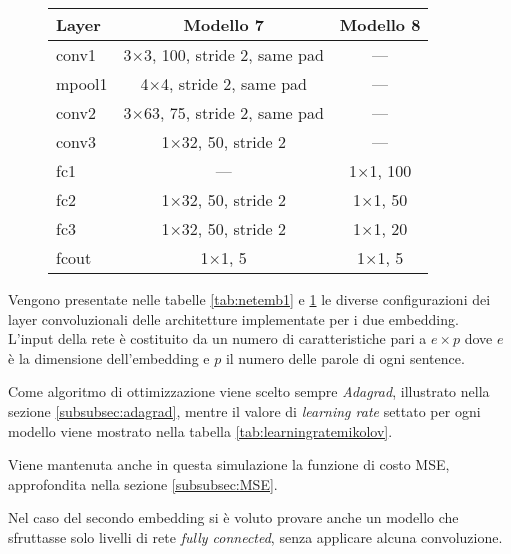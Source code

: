 \begin{figure}[H]
	\centering
	\begin{tabular}{lcc}
		\toprule
		\textbf{Layer}& \textbf{Modello 7} 								  & \textbf{Modello 8} 			   \\ 
		\midrule
		conv1 	& \num{3}$\times$\num{3}, 100, stride 2, same pad     & ---	   \\
		mpool1 	& \num{4}$\times$\num{4}, stride 2, same pad		  & ---	   \\
		conv2  	& \num{3}$\times$\num{63}, 75, stride 2, same pad	  & ---    \\
		conv3  	& \num{1}$\times$\num{32}, 50, stride 2	  				  & ---	   \\
		fc1  	& ---													  & \num{1}$\times$\num{1}, 100	   \\
		fc2  	& \num{1}$\times$\num{32}, 50, stride 2	  				  & \num{1}$\times$\num{1},  50    \\
		fc3  	& \num{1}$\times$\num{32}, 50, stride 2	  				  & \num{1}$\times$\num{1},  20	   \\
		fcout	& \num{1}$\times$\num{1}, 5   			  				  & \num{1}$\times$\num{1},   5	   \\
		\bottomrule	
	\end{tabular}
	\label{tab:netemb2}
\end{figure}

Vengono presentate nelle tabelle \ref{tab:netemb1} e \ref{tab:netemb2} le diverse configurazioni dei layer convoluzionali delle architetture implementate per i due embedding.\\

L'input della rete è costituito da un numero di caratteristiche pari a $e \times p$ dove $e$ è la dimensione dell'embedding e $p$ il numero delle parole di ogni sentence.

Come algoritmo di ottimizzazione viene scelto sempre \emph{Adagrad}, illustrato nella sezione \ref{subsubsec:adagrad}, mentre il valore di \emph{learning rate} settato per ogni modello viene mostrato nella tabella \ref{tab:learningratemikolov}.

Viene mantenuta anche in questa simulazione la funzione di costo MSE, approfondita nella sezione \ref{subsubsec:MSE}.

Nel caso del secondo embedding si è voluto provare anche un modello che sfruttasse solo livelli di rete \emph{fully connected}, senza applicare alcuna convoluzione. 


